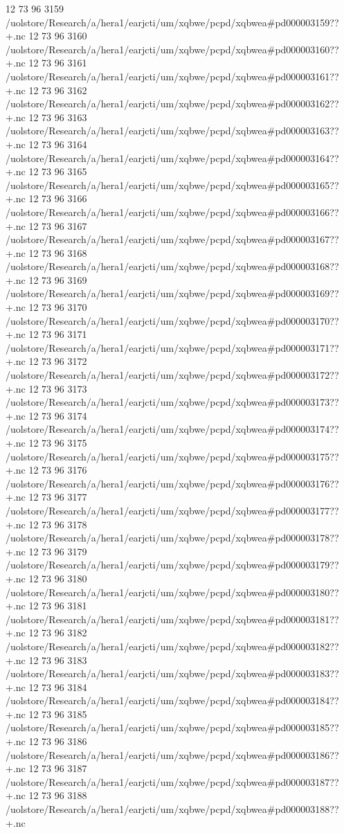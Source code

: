 12 73 96
3159
/uolstore/Research/a/hera1/earjcti/um/xqbwe/pcpd/xqbwea#pd000003159??+.nc
12 73 96
3160
/uolstore/Research/a/hera1/earjcti/um/xqbwe/pcpd/xqbwea#pd000003160??+.nc
12 73 96
3161
/uolstore/Research/a/hera1/earjcti/um/xqbwe/pcpd/xqbwea#pd000003161??+.nc
12 73 96
3162
/uolstore/Research/a/hera1/earjcti/um/xqbwe/pcpd/xqbwea#pd000003162??+.nc
12 73 96
3163
/uolstore/Research/a/hera1/earjcti/um/xqbwe/pcpd/xqbwea#pd000003163??+.nc
12 73 96
3164
/uolstore/Research/a/hera1/earjcti/um/xqbwe/pcpd/xqbwea#pd000003164??+.nc
12 73 96
3165
/uolstore/Research/a/hera1/earjcti/um/xqbwe/pcpd/xqbwea#pd000003165??+.nc
12 73 96
3166
/uolstore/Research/a/hera1/earjcti/um/xqbwe/pcpd/xqbwea#pd000003166??+.nc
12 73 96
3167
/uolstore/Research/a/hera1/earjcti/um/xqbwe/pcpd/xqbwea#pd000003167??+.nc
12 73 96
3168
/uolstore/Research/a/hera1/earjcti/um/xqbwe/pcpd/xqbwea#pd000003168??+.nc
12 73 96
3169
/uolstore/Research/a/hera1/earjcti/um/xqbwe/pcpd/xqbwea#pd000003169??+.nc
12 73 96
3170
/uolstore/Research/a/hera1/earjcti/um/xqbwe/pcpd/xqbwea#pd000003170??+.nc
12 73 96
3171
/uolstore/Research/a/hera1/earjcti/um/xqbwe/pcpd/xqbwea#pd000003171??+.nc
12 73 96
3172
/uolstore/Research/a/hera1/earjcti/um/xqbwe/pcpd/xqbwea#pd000003172??+.nc
12 73 96
3173
/uolstore/Research/a/hera1/earjcti/um/xqbwe/pcpd/xqbwea#pd000003173??+.nc
12 73 96
3174
/uolstore/Research/a/hera1/earjcti/um/xqbwe/pcpd/xqbwea#pd000003174??+.nc
12 73 96
3175
/uolstore/Research/a/hera1/earjcti/um/xqbwe/pcpd/xqbwea#pd000003175??+.nc
12 73 96
3176
/uolstore/Research/a/hera1/earjcti/um/xqbwe/pcpd/xqbwea#pd000003176??+.nc
12 73 96
3177
/uolstore/Research/a/hera1/earjcti/um/xqbwe/pcpd/xqbwea#pd000003177??+.nc
12 73 96
3178
/uolstore/Research/a/hera1/earjcti/um/xqbwe/pcpd/xqbwea#pd000003178??+.nc
12 73 96
3179
/uolstore/Research/a/hera1/earjcti/um/xqbwe/pcpd/xqbwea#pd000003179??+.nc
12 73 96
3180
/uolstore/Research/a/hera1/earjcti/um/xqbwe/pcpd/xqbwea#pd000003180??+.nc
12 73 96
3181
/uolstore/Research/a/hera1/earjcti/um/xqbwe/pcpd/xqbwea#pd000003181??+.nc
12 73 96
3182
/uolstore/Research/a/hera1/earjcti/um/xqbwe/pcpd/xqbwea#pd000003182??+.nc
12 73 96
3183
/uolstore/Research/a/hera1/earjcti/um/xqbwe/pcpd/xqbwea#pd000003183??+.nc
12 73 96
3184
/uolstore/Research/a/hera1/earjcti/um/xqbwe/pcpd/xqbwea#pd000003184??+.nc
12 73 96
3185
/uolstore/Research/a/hera1/earjcti/um/xqbwe/pcpd/xqbwea#pd000003185??+.nc
12 73 96
3186
/uolstore/Research/a/hera1/earjcti/um/xqbwe/pcpd/xqbwea#pd000003186??+.nc
12 73 96
3187
/uolstore/Research/a/hera1/earjcti/um/xqbwe/pcpd/xqbwea#pd000003187??+.nc
12 73 96
3188
/uolstore/Research/a/hera1/earjcti/um/xqbwe/pcpd/xqbwea#pd000003188??+.nc
